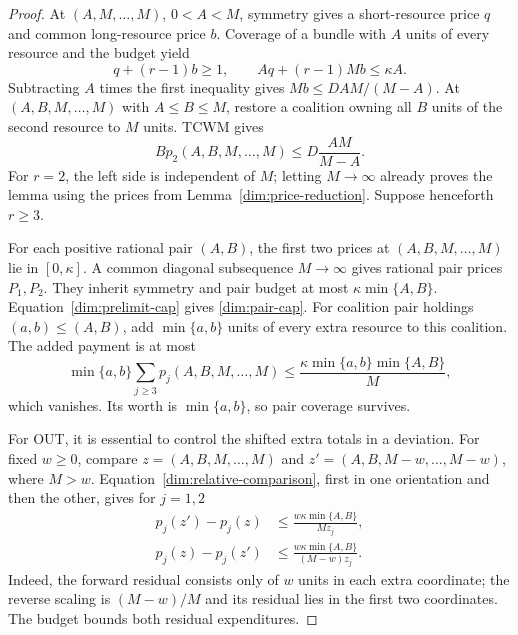 \begin{proof}
At $(A,M,\ldots,M)$, $0<A<M$, symmetry gives a short-resource price
$q$ and common long-resource price $b$. Coverage of a bundle with $A$
units of every resource and the budget yield
\[
 q+(r-1)b\ge1,\qquad Aq+(r-1)Mb\le\kappa A.
\]
Subtracting $A$ times the first inequality gives
$Mb\le D A M/(M-A)$.
At $(A,B,M,\ldots,M)$ with $A\le B\le M$, restore a coalition owning
all $B$ units of the second resource to $M$ units. TCWM gives
\begin{equation}\label{dim:prelimit-cap}
 Bp_2(A,B,M,\ldots,M)\le D\frac{AM}{M-A}.
\end{equation}
For $r=2$, the left side is independent of $M$; letting $M\to\infty$
already proves the lemma using the prices from
Lemma~\ref{dim:price-reduction}. Suppose henceforth $r\ge3$.

For each positive rational pair $(A,B)$, the first two prices at
$(A,B,M,\ldots,M)$ lie in $[0,\kappa]$. A common diagonal subsequence
$M\to\infty$ gives rational pair prices $P_1,P_2$.
They inherit symmetry and pair budget at most $\kappa\min\{A,B\}$.
Equation~\eqref{dim:prelimit-cap} gives \eqref{dim:pair-cap}.
For coalition pair holdings $(a,b)\le(A,B)$, add $\min\{a,b\}$ units
of every extra resource to this coalition. The added payment is at most
\[
 \min\{a,b\}\sum_{j\ge3}p_j(A,B,M,\ldots,M)
 \le\frac{\kappa\min\{a,b\}\min\{A,B\}}{M},
\]
which vanishes. Its worth is $\min\{a,b\}$, so pair coverage survives.

For OUT, it is essential to control the shifted extra totals in a
deviation. For fixed $w\ge0$, compare
$z=(A,B,M,\ldots,M)$ and $z'=(A,B,M-w,\ldots,M-w)$, where $M>w$.
Equation~\eqref{dim:relative-comparison}, first in one orientation and
then the other, gives for $j=1,2$
\begin{align}
 p_j(z')-p_j(z)&\le\frac{w\kappa\min\{A,B\}}{Mz_j},
 \label{dim:shift-bound}\\
 p_j(z)-p_j(z')&\le
 \frac{w\kappa\min\{A,B\}}{(M-w)z_j}.\nonumber
\end{align}
Indeed, the forward residual consists only of $w$ units in each extra
coordinate; the reverse scaling is $(M-w)/M$ and its residual lies in
the first two coordinates. The budget bounds both residual expenditures.


\end{proof}
